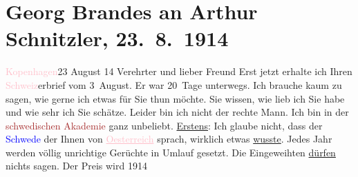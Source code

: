 

               \section[Georg Brandes an Arthur Schnitzler, 23. 8. 1914]{ Georg Brandes an Arthur Schnitzler, 23. 8. 1914}\nopagebreak{}\rehead{ }\normalsize\beginnumbering{} \toendnotes[C]{\smallbreak\pagebreak[2]} 
\toendnotes[C]{\smallbreak}\pstart
           \raggedleft{}{\pb}\textcolor{pink}{Kopenhagen}{}\ledrightnote{\textcolor{pink}{Kopenhagen}}{\\}23 August 14\pend
           \pstart{}Verehrter und lieber Freund\pend\pstart
           Erst jetzt erhalte ich Ihren \textcolor{pink}{Schweiz}{}\ledrightnote{\textcolor{pink}{Schweiz}}erbrief
                    vom 3 August. Er war 20 Tage unterwegs.\pend
           \pstart
           Ich brauche kaum zu sagen, wie gerne ich etwas für Sie thun möchte. Sie wissen,
                    wie lieb ich Sie habe und wie sehr ich Sie schätze.\pend
           \pstart
           Leider bin ich nicht der rechte Mann. Ich bin in der \textcolor{brown}{schwedischen Akademie}{}\ledrightnote{\textcolor{brown}{Kungliga Vetenskapsakademien}} ganz unbeliebt.\pend
           \pstart
           \uline{Erstens}: Ich glaube nicht, dass
                    der \textcolor{blue}{Schwede}{} der Ihnen von
                        \textcolor{pink}{\uline{Oesterreich}}{}\ledrightnote{\textcolor{pink}{Österreich}} sprach, wirklich etwas \uline{wusste}. Jedes Jahr
                    werden völlig unrichtige Gerüchte in Umlauf gesetzt. Die Eingeweihten \uline{dürfen} nichts sagen. Der Preis wird 1914
